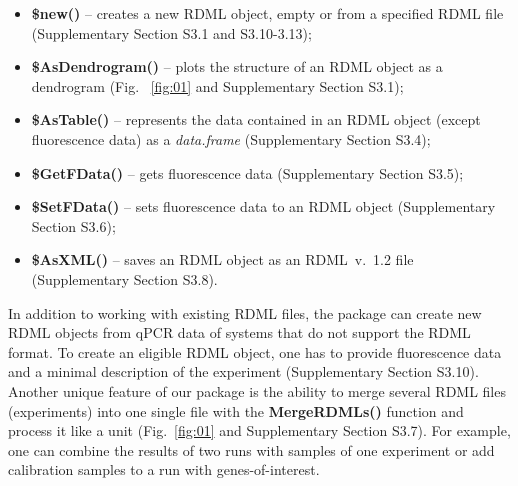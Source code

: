 \documentclass{bioinfo}
\begin{document}
\begin{itemize} 
\item \textbf{\$new()} -- creates a new RDML object,  empty or from a specified RDML 
file (Supplementary Section S3.1 and S3.10-3.13);
\item \textbf{\$AsDendrogram()} -- plots the
structure of an RDML object as a dendrogram  (Fig.~ \ref{fig:01} and Supplementary Section 
S3.1);
\item \textbf{\$AsTable()} -- represents the data contained in an RDML object (except 
fluorescence data) as a \textit{data.frame} (Supplementary Section S3.4);
\item \textbf{\$GetFData()} -- gets fluorescence data (Supplementary Section S3.5);
\item \textbf{\$SetFData()} -- sets fluorescence data to an RDML object (Supplementary Section S3.6); 
\item \textbf{\$AsXML()} – saves an RDML object as an RDML~v.~1.2 file (Supplementary Section S3.8).
\end{itemize}
In addition to working with existing RDML files, the package can create new RDML 
objects from  qPCR data  of systems that do not support the RDML format. To 
create an eligible RDML object, one has to provide fluorescence data and a minimal  
description of the experiment (Supplementary Section S3.10). Another unique feature of our 
package is the ability to merge several RDML files (experiments) into one single file with the 
\textbf{MergeRDMLs()} function and process  it like a unit (Fig.~\ref{fig:01} and Supplementary Section 
S3.7). For example,  one can combine the results of two runs with samples of one 
experiment or add calibration samples to a run with genes-of-interest.
\end{document}
